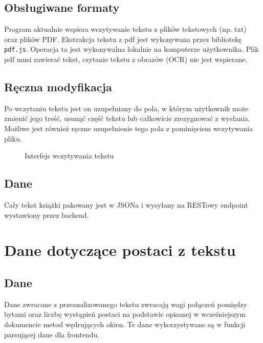 \documentclass[12pt,a4paper]{article} %
\begin{document}
    \subsection{Obsługiwane formaty}
        Program aktualnie wspiera wczytywanie tekstu z plików tekstowych (np. txt) oraz plików PDF. Ekstrakcja tekstu z pdf jest wykonywana przez bibliotekę \texttt{pdf.js}. Operacja ta jest wykonywalna lokalnie na komputerze użytkownika. Plik pdf musi zawierać tekst, czytanie tekstu z obrazów (OCR) nie jest wspierane.
    
    \subsection{Ręczna modyfikacja}
        Po wczytaniu tekstu jest on uzupełniany do pola, w którym użytkownik może zmienić jego treść, usunąć część tekstu lub całkowicie zrezygnować z wysłania. Możliwe jest również ręczne uzupełnienie tego pola z pominięciem wczytywania pliku.
        
        \begin{figure}[h!]
            \centering
            \caption{Interfejs wczytywania tekstu}
        \end{figure}
        
    \subsection{Dane}
        Cały tekst książki pakowany jest w JSONa i wysyłany na RESTowy endpoint wystawiony przez backend.

\section{Dane dotyczące postaci z tekstu}

    \subsection{Dane}
        Dane zwracane z przeanalizowanego tekstu zwracają wagi połączeń pomiędzy bytami oraz liczbę wystąpień postaci na podstawie opisanej w wcześniejszym dokumencie metod wędrujących okien. Te dane wykorzystywane są w funkcji parsującej dane dla frontendu.\\
    
\end{document}
